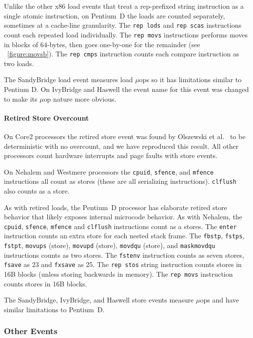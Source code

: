 Unlike the other x86 load events that treat a rep-prefixed string
instruction as a single atomic instruction, on Pentium~D the
loads are counted separately, sometimes at a
cache-line granularity.  The {\tt rep lods} and {\tt rep scas} 
instructions count  each repeated load individually.  
The {\tt rep movs} instructions
performs moves in blocks of 64-bytes, then goes one-by-one
for the remainder (see \figurename~\ref{figure:movsb}).
The {\tt rep cmps} instruction counts each compare instruction
as two loads.

The SandyBridge load event measures load $\mu$ops so it has
limitations similar to Pentium D.  
On IvyBridge and Haswell the event name
for this event was changed to make its $\mu$op nature more obvious.

\paragraph{Retired Store Overcount}

On Core2 processors the retired store event 
was found by Olszewski et al.~\cite{olszewski+:asplos09} to be deterministic
with no overcount, and we have reproduced this result.
All other processors count hardware
interrupts and page faults with store events.

On Nehalem and Westmere processors the {\tt cpuid}, {\tt sfence}, 
and {\tt mfence} instructions all count as stores (these are all
serializing instructions).  {\tt clflush} also counts as a store.

As with retired loads, the Pentium~D processor has elaborate
retired store behavior that likely exposes internal microcode
behavior.  As with Nehalem, the {\tt cpuid}, {\tt sfence}, {\tt mfence} 
and {\tt clflush} instructions count as a stores.
The {\tt enter} instruction counts an extra store for each nested stack frame.
The {\tt fbstp}, {\tt fstps}, {\tt fstpt}, {\tt movups} (store),
{\tt movupd} (store), {\tt movdqu} (store), and {\tt maskmovdqu} 
instructions counts as two stores.  The {\tt fstenv} instruction counts as 
seven stores, {\tt fsave} as 23 and {\tt fxsave} as 25.
The {\tt rep stos} string instruction counts stores 
in 16B blocks (unless storing backwards in memory).
The {\tt rep movs} instruction counts stores in 16B blocks.

The SandyBridge, IvyBridge, and Haswell store events measure $\mu$ops 
and have similar limitations to Pentium~D.

\subsubsection{Other Events}

